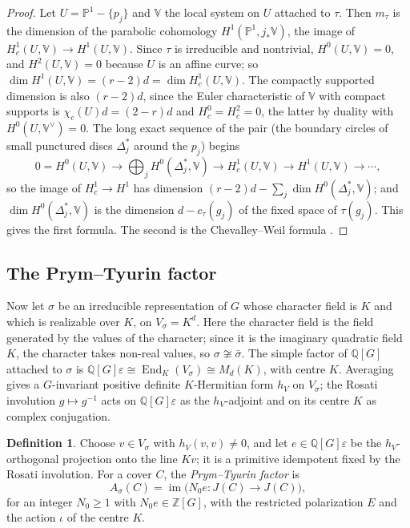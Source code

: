 \documentclass[11pt]{amsart}
\theoremstyle{definition}
\newtheorem{definition}[theorem]{Definition}
\theoremstyle{remark}
\newcommand{\Q}{\mathbb Q}
\newcommand{\Z}{\mathbb Z}
\newcommand{\PP}{\mathbb P}
\newcommand{\End}{\operatorname{End}}
\begin{document}
\begin{proof}
Let $U=\PP^1-\{p_j\}$ and $\mathbb V$ the local system on $U$ attached to $\tau$. Then $m_\tau$ is the dimension of the parabolic cohomology $H^1(\PP^1,j_*\mathbb V)$, the image of $H^1_c(U,\mathbb V)\to H^1(U,\mathbb V)$. Since $\tau$ is irreducible and nontrivial, $H^0(U,\mathbb V)=0$, and $H^2(U,\mathbb V)=0$ because $U$ is an affine curve; so $\dim H^1(U,\mathbb V)=(r-2)d=\dim H^1_c(U,\mathbb V)$. The compactly supported dimension is also $(r-2)d$, since the Euler characteristic of $\mathbb V$ with compact supports is $\chi_c(U)d=(2-r)d$ and $H^0_c=H^2_c=0$, the latter by duality with $H^0(U,\mathbb V^\vee)=0$. The long exact sequence of the pair (the boundary circles of small punctured discs $\Delta_j^*$ around the $p_j$) begins
\[
0=H^0(U,\mathbb V)\to\textstyle\bigoplus_jH^0(\Delta_j^*,\mathbb V)\to H^1_c(U,\mathbb V)\to H^1(U,\mathbb V)\to\cdots,
\]
so the image of $H^1_c\to H^1$ has dimension $(r-2)d-\sum_j\dim H^0(\Delta_j^*,\mathbb V)$; and $\dim H^0(\Delta_j^*,\mathbb V)$ is the dimension $d-c_\tau(g_j)$ of the fixed space of $\tau(g_j)$. This gives the first formula. The second is the Chevalley--Weil formula \cite[Theorem~2.10]{FGP}.
\end{proof}

\subsection{The Prym--Tyurin factor}\label{subsec:pt}
Now let $\sigma$ be an irreducible representation of $G$ whose character field is $K$ and which is realizable over $K$, on $V_\sigma=K^d$. Here the character field is the field generated by the values of the character; since it is the imaginary quadratic field $K$, the character takes non-real values, so $\sigma\not\cong\bar\sigma$. The simple factor of $\Q[G]$ attached to $\sigma$ is $\Q[G]\varepsilon\cong\End_K(V_\sigma)\cong M_d(K)$, with centre $K$. Averaging gives a $G$-invariant positive definite $K$-Hermitian form $h_V$ on $V_\sigma$; the Rosati involution $g\mapsto g^{-1}$ acts on $\Q[G]\varepsilon$ as the $h_V$-adjoint and on its centre $K$ as complex conjugation.

\begin{definition}\label{def:pt}
Choose $v\in V_\sigma$ with $h_V(v,v)\ne0$, and let $e\in\Q[G]\varepsilon$ be the $h_V$-orthogonal projection onto the line $Kv$; it is a primitive idempotent fixed by the Rosati involution. For a cover $C$, the \emph{Prym--Tyurin factor} is
\[
A_\sigma(C)=\operatorname{im}\big(N_0e\colon J(C)\to J(C)\big),
\]
for an integer $N_0\ge1$ with $N_0e\in\Z[G]$, with the restricted polarization $E$ and the action $\iota$ of the centre $K$.
\end{definition}
\end{document}
